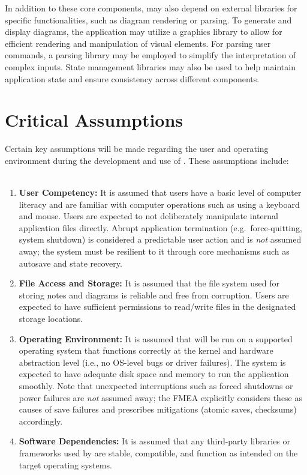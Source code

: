 \documentclass{article}
\begin{document}
In addition to these core components, \progname may also depend on external
libraries for specific functionalities, such as diagram rendering or parsing.
To generate and display diagrams, the application may utilize a graphics 
library to allow for efficient rendering and manipulation of visual elements.
For parsing user commands, a parsing library may be employed to simplify the
interpretation of complex inputs. State management libraries may also be used
to help maintain application state and ensure consistency across different
components.


\section{Critical Assumptions}

Certain key assumptions will be made regarding the user and operating environment
during the development and use of \progname. These assumptions include:
\\
\\
\begin{enumerate}
    \item \textbf{User Competency:} It is assumed that users have a basic level
    of computer literacy and are familiar with computer operations such as using
    a keyboard and mouse. Users are expected to not deliberately manipulate
    internal application files directly. Abrupt application termination (e.g.\
    force-quitting, system shutdown) is considered a predictable user action
    and is \emph{not} assumed away; the system must be resilient to it through
    core mechanisms such as autosave and state recovery.
    \item \textbf{File Access and Storage:} It is assumed that the file system
    used for storing notes and diagrams is reliable and free from corruption.
    Users are expected to have sufficient permissions to read/write files in
    the designated storage locations.
    \item \textbf{Operating Environment:} It is assumed that \progname will be
    run on a supported operating system that functions correctly at the kernel
    and hardware abstraction level (i.e., no OS-level bugs or driver failures).
    The system is expected to have adequate disk space and memory to run the
    application smoothly. Note that unexpected interruptions such as forced
    shutdowns or power failures are \emph{not} assumed away; the FMEA
    explicitly considers these as causes of save failures and prescribes
    mitigations (atomic saves, checksums) accordingly.
    \item \textbf{Software Dependencies:} It is assumed that any third-party
    libraries or frameworks used by \progname are stable, compatible, and
    function as intended on the target operating systems. 
\end{enumerate}
\end{document}
